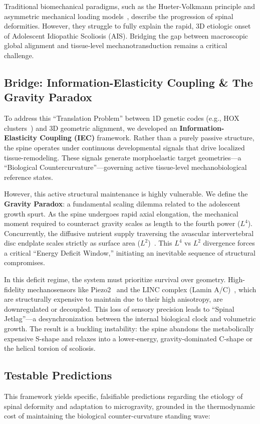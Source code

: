 \documentclass[11pt,a4paper]{article}
\begin{document}
Traditional biomechanical paradigms, such as the Hueter-Volkmann principle and asymmetric mechanical loading models~\cite{stokes2006hueter}, describe the progression of spinal deformities. However, they struggle to fully explain the rapid, 3D etiologic onset of Adolescent Idiopathic Scoliosis (AIS). Bridging the gap between macroscopic global alignment and tissue-level mechanotransduction remains a critical challenge.

\subsection{Bridge: Information-Elasticity Coupling \& The Gravity Paradox}
To address this ``Translation Problem'' between 1D genetic codes (e.g., HOX clusters~\cite{wellik2007hox}) and 3D geometric alignment, we developed an \textbf{Information-Elasticity Coupling (IEC)} framework. Rather than a purely passive structure, the spine operates under continuous developmental signals that drive localized tissue-remodeling. These signals generate morphoelastic target geometries---a ``Biological Countercurvature''---governing active tissue-level mechanobiological reference states.

However, this active structural maintenance is highly vulnerable. We define the \textbf{Gravity Paradox}: a fundamental scaling dilemma related to the adolescent growth spurt. As the spine undergoes rapid axial elongation, the mechanical moment required to counteract gravity scales as length to the fourth power ($L^4$). Concurrently, the diffusive nutrient supply traversing the avascular intervertebral disc endplate scales strictly as surface area ($L^2$)~\cite{urban2004nutrition}. This $L^4$ vs $L^2$ divergence forces a critical ``Energy Deficit Window,'' initiating an inevitable sequence of structural compromises.

In this deficit regime, the system must prioritize survival over geometry. High-fidelity mechanosensors like Piezo2~\cite{wang2020piezo2} and the LINC complex (Lamin A/C)~\cite{cheng2019lamin}, which are structurally expensive to maintain due to their high anisotropy, are downregulated or decoupled. This loss of sensory precision leads to ``Spinal Jetlag''---a desynchronization between the internal biological clock and volumetric growth. The result is a buckling instability: the spine abandons the metabolically expensive S-shape and relaxes into a lower-energy, gravity-dominated C-shape or the helical torsion of scoliosis.

\subsection{Testable Predictions}
This framework yields specific, falsifiable predictions regarding the etiology of spinal deformity and adaptation to microgravity, grounded in the thermodynamic cost of maintaining the biological counter-curvature standing wave:
\end{document}
